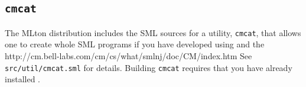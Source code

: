 
\subsection{{\tt cmcat}}

The MLton distribution includes the SML sources for a utility,
{\tt cmcat}, that allows one to create whole SML programs if you
have developed using {\smlnj} and the 
		  {http://cm.bell-labs.com/cm/cs/what/smlnj/doc/CM/index.htm}
See {\tt src/util/cmcat.sml} for details.  Building {\tt cmcat}
requires that you have already installed {\smlnj}.
